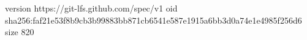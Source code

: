 version https://git-lfs.github.com/spec/v1
oid sha256:faf21e53f8b9cb3b99883bb871cb6541e587e1915a6bb3d0a74e1e4985f256d6
size 820
